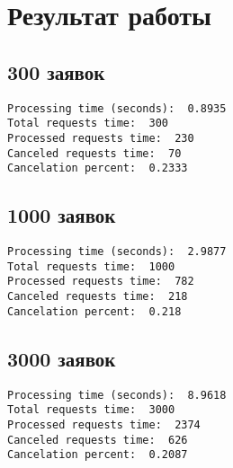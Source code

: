\chapter{Результат работы}

\section{300 заявок}

\begin{verbatim}
Processing time (seconds):  0.8935
Total requests time:  300
Processed requests time:  230
Canceled requests time:  70
Cancelation percent:  0.2333
\end{verbatim}


\section{1000 заявок}

\begin{verbatim}
Processing time (seconds):  2.9877
Total requests time:  1000
Processed requests time:  782
Canceled requests time:  218
Cancelation percent:  0.218
\end{verbatim}


\section{3000 заявок}

\begin{verbatim}
Processing time (seconds):  8.9618
Total requests time:  3000
Processed requests time:  2374
Canceled requests time:  626
Cancelation percent:  0.2087
\end{verbatim}


